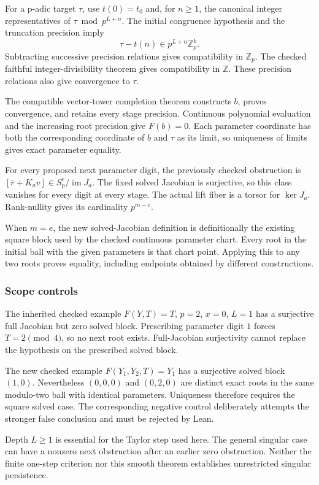For a p-adic target \(\tau\), use \(t(0)=t_0\) and, for \(n\ge1\), the
canonical integer representatives of \(\tau\bmod p^{L+n}\). The initial
congruence hypothesis and the truncation precision imply \[
\tau-t(n)\in p^{L+n}\mathbb Z_p^k.
\] Subtracting successive precision relations gives compatibility in
\(\mathbb Z_p\). The checked faithful integer-divisibility theorem gives
compatibility in \(\mathbb Z\). These precision relations also give
convergence to \(\tau\).

The compatible vector-tower completion theorem constructs \(b\), proves
convergence, and retains every stage precision. Continuous polynomial
evaluation and the increasing root precision give \(F(b)=0\). Each
parameter coordinate has both the corresponding coordinate of \(b\) and
\(\tau\) as its limit, so uniqueness of limits gives exact parameter
equality.

For every proposed next parameter digit, the previously checked
obstruction is \([\bar r+K_av]\in S_p^e/\operatorname{im}J_a\). The
fixed solved Jacobian is surjective, so this class vanishes for every
digit at every stage. The actual lift fiber is a torsor for
\(\ker J_a\). Rank-nullity gives its cardinality \(p^{m-e}\).

When \(m=e\), the new solved-Jacobian definition is definitionally the
existing square block used by the checked continuous parameter chart.
Every root in the initial ball with the given parameters is that chart
point. Applying this to any two roots proves equality, including
endpoints obtained by different constructions.

\hypertarget{cont9:scope-controls}{%
\subsubsection{Scope controls}\label{cont9:scope-controls}}

The inherited checked example \(F(Y,T)=T\), \(p=2\), \(x=0\), \(L=1\)
has a surjective full Jacobian but zero solved block. Prescribing
parameter digit \(1\) forces \(T=2\pmod4\), so no next root exists.
Full-Jacobian surjectivity cannot replace the hypothesis on the
prescribed solved block.

The new checked example \(F(Y_1,Y_2,T)=Y_1\) has a surjective solved
block \((1,0)\). Nevertheless \((0,0,0)\) and \((0,2,0)\) are distinct
exact roots in the same modulo-two ball with identical parameters.
Uniqueness therefore requires the square solved case. The corresponding
negative control deliberately attempts the stronger false conclusion and
must be rejected by Lean.

Depth \(L\ge1\) is essential for the Taylor step used here. The general
singular case can have a nonzero next obstruction after an earlier zero
obstruction. Neither the finite one-step criterion nor this smooth
theorem establishes unrestricted singular persistence.
